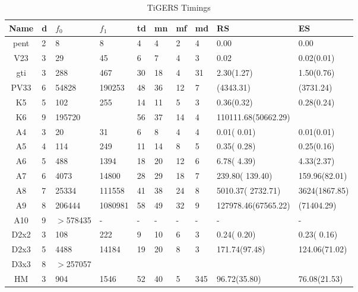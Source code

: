 \documentclass[11pt]{article}
\begin{document}
\begin{table}[hbt]
\begin{tabular}{||c||l|l|l|l||l|l|l||l|l||}\hline
                  Name & d & $f_0$ & $f_1$ &td & mn & mf & md & RS  & ES  \\
\hline\hline
  pent&  2&     8&      8& 4&  4&  2&  4&      0.00 & 0.00\\
  V23 &  3&    29&     45& 6&  7&  4&  3&      0.02 & 0.02(0.01)   \\
  gti &  3&   288&    467&30& 18&  4& 31& 2.30(1.27)& 1.50(0.76) \\
  PV33&  6& 54828& 190253&48& 36& 12&  7&  (4343.31)&  (3731.24)  \\
\hline
  K5  &  5 &     102 & 255 &14 & 11 & 5  & 3 & 0.36(0.32) & 0.28(0.24) \\
  K6  &  9 &  195720 &     &56 & 37 & 14 & 4 & 110111.68(50662.29)& \\
\hline
   A4& 3 &     20&      31&  6&  8&  4& 4&     0.01(    0.01)&0.01(0.01) \\
   A5& 4 &    114&     249& 11& 14&  8& 5&     0.35(    0.28)&0.25(0.16)\\
   A6& 5 &    488&    1394& 18& 20& 12& 6&     6.78(    4.39)&4.33(2.37)\\
   A7& 6 &   4073&   14800& 28& 29& 18& 7&   239.80(  139.40)&159.96(82.01)\\
   A8& 7 &  25334&  111558& 41& 38& 24& 8&  5010.37( 2732.71)&3624(1867.85)\\
   A9& 8 & 206444& 1080981& 58& 49& 32& 9&127978.46(67565.22) & (71404.29) \\
  A10&  9 &$>$578435& -  & -  &  - & -  & - & -           & -      \\
\hline

   D2x2& 3&  108&   222&  9& 10& 6& 3&  0.24( 0.20) &   0.23( 0.16) \\
   D2x3& 5& 4488& 14184& 19& 20& 8& 3&171.74(97.48) & 124.06(71.02) \\
   D3x3& 8&  $>$257057& & &    &   &   &              &  \\
\hline
 HM &3&904&1546&52 &40 &5&345&96.72(35.80)&76.08(21.53)\\
\hline
\end{tabular}
\caption{\label{TIMING} TiGERS Timings }
\end{table}
\end{document}
